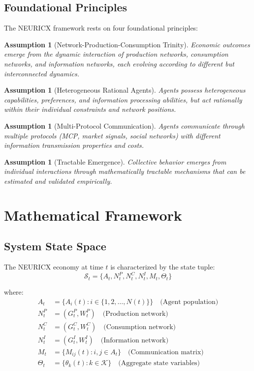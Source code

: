 \documentclass[12pt,a4paper]{article}
\newtheorem{assumption}[theorem]{Assumption}
\begin{document}
\subsection{Foundational Principles}

The NEURICX framework rests on four foundational principles:

\begin{assumption}[Network-Production-Consumption Trinity]
Economic outcomes emerge from the dynamic interaction of production networks, consumption networks, and information networks, each evolving according to different but interconnected dynamics.
\end{assumption}

\begin{assumption}[Heterogeneous Rational Agents]
Agents possess heterogeneous capabilities, preferences, and information processing abilities, but act rationally within their individual constraints and network positions.
\end{assumption}

\begin{assumption}[Multi-Protocol Communication]
Agents communicate through multiple protocols (MCP, market signals, social networks) with different information transmission properties and costs.
\end{assumption}

\begin{assumption}[Tractable Emergence]
Collective behavior emerges from individual interactions through mathematically tractable mechanisms that can be estimated and validated empirically.
\end{assumption}

\section{Mathematical Framework}

\subsection{System State Space}

The NEURICX economy at time $t$ is characterized by the state tuple:
\begin{equation}
\mathcal{S}_t = \{A_t, N_t^P, N_t^C, N_t^I, M_t, \Theta_t\}
\end{equation}

where:
\begin{align}
A_t &= \{A_i(t) : i \in \{1, 2, \ldots, N(t)\}\} \quad \text{(Agent population)} \\
N_t^P &= (G_t^P, W_t^P) \quad \text{(Production network)} \\
N_t^C &= (G_t^C, W_t^C) \quad \text{(Consumption network)} \\
N_t^I &= (G_t^I, W_t^I) \quad \text{(Information network)} \\
M_t &= \{M_{ij}(t) : i,j \in A_t\} \quad \text{(Communication matrix)} \\
\Theta_t &= \{\theta_k(t) : k \in \mathcal{K}\} \quad \text{(Aggregate state variables)}
\end{align}
\end{document}
